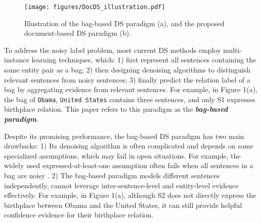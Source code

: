 \documentclass[11pt,a4paper]{article}
\begin{document}
  \begin{figure}[!tbp]
    \setlength{\belowcaptionskip}{-1em}
    \centering  
    \texttt{[image: figures/DocDS\_illustration.pdf]}
   \caption{Illustration of the bag-based DS paradigm (a), and the proposed document-based DS paradigm (b).}
    \label{fig:fig1}
  \end{figure}
  
  To address the noisy label problem, most current DS methods \cite{riedel_modeling_2010,zeng_distant_2015,lin_neural_2016, yuan_crossrelation_2018, ye_distant_2019} employ multi-instance learning techniques, which: 
  1) first represent all sentences containing the same entity pair as a bag; 
  2) then designing denoising algorithms to distinguish relevant sentences from noisy sentences;
  3) finally predict the relation label of a bag by aggregating evidence from relevant sentences.
  For example, in Figure 1(a), the bag of \texttt{Obama}, \texttt{United States} contains three sentences, and only S1 expresses birthplace relation.
  This paper refers to this paradigm as the \textbf{\emph{bag-based paradigm}}.
  
  Despite its promising performance, the bag-based DS paradigm has two main drawbacks:
  1) Its denoising algorithm is often complicated and depends on some specialized assumptions, which may fail in open situations.
  For example, the widely used expressed-at-least-one assumption \cite{riedel_modeling_2010} often fails when all sentences in a bag are noisy \cite{ye_distant_2019}.
  2) The bag-based paradigm models different sentences independently, cannot leverage inter-sentence-level and entity-level evidence effectively.
  For example, in Figure 1(a), although S2 does not directly express the birthplace between Obama and the United States, it can still provide helpful confidence evidence for their birthplace relation.
  
\end{document}
